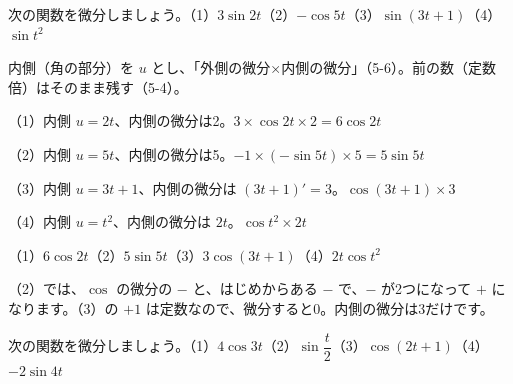 \begin{kotoba}
\small
{}
\end{kotoba}


\begin{reidai}
次の関数を微分しましょう。\quad（1）$3\sin2t$\quad（2）$-\cos5t$\quad（3）$\sin(3t+1)$\quad（4）$\sin t^2$\par
\kangaekata 内側（角の部分）を $u$ とし、「外側の微分×内側の微分」（5-6）。前の数（定数倍）はそのまま残す（5-4）。\par
\shiki（1）内側 $u=2t$、内側の微分は2。$3\times\cos2t\times2=6\cos2t$\par
\hspace*{2.6\zw}（2）内側 $u=5t$、内側の微分は5。$-1\times(-\sin5t)\times5=5\sin5t$\par
\hspace*{2.6\zw}（3）内側 $u=3t+1$、内側の微分は $(3t+1)'=3$。$\cos(3t+1)\times3$\par
\hspace*{2.6\zw}（4）内側 $u=t^2$、内側の微分は $2t$。$\cos t^2\times2t$\par
\kotae （1）$6\cos2t$\quad（2）$5\sin5t$\quad（3）$3\cos(3t+1)$\quad（4）$2t\cos t^2$
\end{reidai}
（2）では、$\cos$ の微分の $-$ と、はじめからある $-$ で、$-$ が2つになって $+$ になります。（3）の $+1$ は定数なので、微分すると0。内側の微分は3だけです。

\begin{jibun}
次の関数を微分しましょう。\quad（1）$4\cos3t$\quad（2）$\sin\dfrac{t}{2}$\quad（3）$\cos(2t+1)$\quad（4）$-2\sin4t$
\end{jibun}

